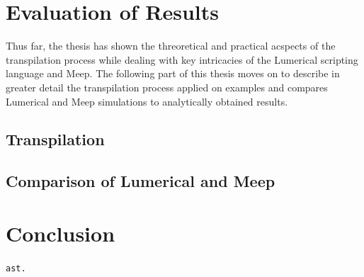 \chapter{Evaluation of Results}
Thus far, the thesis has shown the threoretical and practical acspects of the transpilation process while dealing with key intricacies of the Lumerical scripting language and Meep. The following part of this thesis moves on to describe in greater detail the transpilation process applied on examples and compares Lumerical and Meep simulations to analytically obtained results.
\section{Transpilation}

\section{Comparison of Lumerical and Meep}


\chapter{Conclusion}

\texttt{\tiny{ast.}}